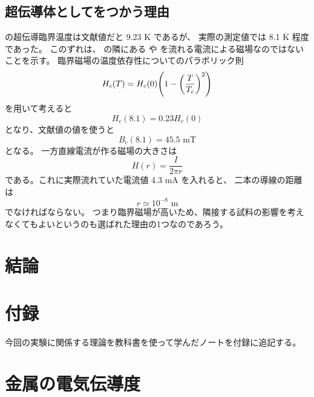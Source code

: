 \documentclass[11pt,dvipdfmx,a4paper]{jsarticle}
\begin{document}
\subsection{超伝導体としてをつかう理由}
 の超伝導臨界温度は文献値\cite{rikanenpyo}だと 9.23 K であるが、
実際の測定値では 8.1 K 程度であった。
このずれは、 の隣にある  や  を流れる電流による磁場なのではないことを示す。
臨界磁場の温度依存性についてのパラボリック則
\begin{equation}
    H_c(T) = H_c(0)\qty(1-\qty(\frac{T}{T_c})^2)
\end{equation}
を用いて考えると
\begin{equation}
    H_c(8.1) = 0.23 H_c(0)
\end{equation}
となり、文献値\cite{rikanenpyo}の値を使うと
\begin{equation}
    B_c(8.1) = 45.5 \text{ mT}
\end{equation}
となる。
一方直線電流が作る磁場の大きさは
\begin{equation}
    H(r) = \frac{I}{2\pi r}
\end{equation}
である。これに実際流れていた電流値 4.3 mA を入れると、
二本の導線の距離は
\begin{equation}
    r \simeq 10^{-8} \text{ m}
\end{equation}
でなければならない。
つまり臨界磁場が高いため、隣接する試料の影響を考えなくてもよいというのも選ばれた理由の1つなのであろう。

\section{結論}





\section*{付録}
今回の実験に関係する理論を教科書\cite{ibach-luth}を使って学んだノートを付録に追記する。
\section{金属の電気伝導度}
\end{document}
